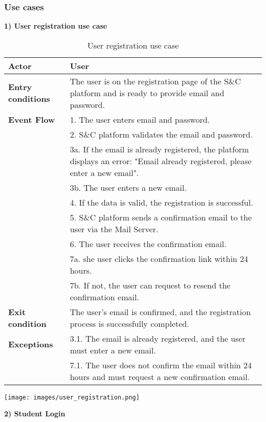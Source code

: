 \subsubsection{Use cases} 
\textbf{1) User registration use case}\\
\begin{table}[h!]
    \centering
    \begin{tabular}{lp{10cm}}
        \textbf{Actor} & User \\ \hline
        \textbf{Entry conditions} & The user is on the registration page of the S\&C platform and is ready to provide email and password. \\ \hline
        \textbf{Event Flow} & 
       1. The user enters email and password. \\
        & 2. S\&C platform validates the email and password. \\
        & 3a. If the email is already registered, the platform displays an error: "Email already registered, please enter a new email". \\
        & 3b. The user enters a new email. \\
        & 4. If the data is valid, the registration is successful. \\
        & 5. S\&C platform sends a confirmation email to the user via the Mail Server. \\
        & 6. The user receives the confirmation email. \\
        & 7a. she user clicks the confirmation link within 24 hours. \\
        & 7b. If not, the user can request to resend the confirmation email. \\
        \hline
        \textbf{Exit condition} & The user's email is confirmed, and the registration process is successfully completed. \\ \hline
        \textbf{Exceptions} & 
        3.1. The email is already registered, and the user must enter a new email. \\
        & 7.1. The user does not confirm the email within 24 hours and must request a new confirmation email. \\
    \end{tabular}
    \caption{User registration use case}
    \label{tab:user_registration}
\end{table}


\begin{center}
    \texttt{[image: images/user\_registration.png]}
\end{center}
\newpage
\textbf{2) Student Login}\\

